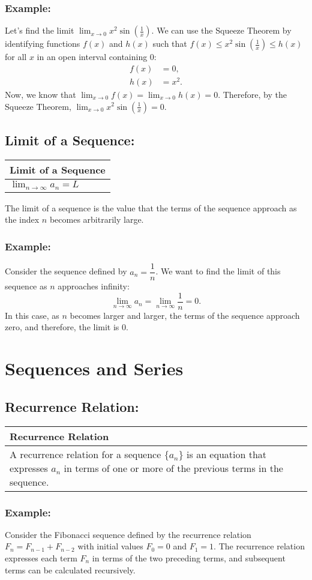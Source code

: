 \documentclass[12pt]{article}
\newcommand{\formula}[2]{
    {\renewcommand{\arraystretch}{2}
        \begin{center}
        \begin{tabular}{|p{0.9\textwidth}|}
        \hline
        \textbf{#1} \\
        \hline
        #2 \\
        \hline
        \end{tabular}
        \end{center}
    }
}
\begin{document}
\subsubsection{Example:}
Let's find the limit $\lim_{x \to 0} x^2 \sin\left(\frac{1}{x}\right)$. We can use the Squeeze Theorem by identifying functions $f(x)$ and $h(x)$ such that $f(x) \leq x^2 \sin\left(\frac{1}{x}\right) \leq h(x)$ for all $x$ in an open interval containing $0$:
\[
\begin{aligned}
    f(x) &= 0, \\
    h(x) &= x^2.
\end{aligned}
\]
Now, we know that $\lim_{x \to 0} f(x) = \lim_{x \to 0} h(x) = 0$. Therefore, by the Squeeze Theorem, $\lim_{x \to 0} x^2 \sin\left(\frac{1}{x}\right) = 0$.

\subsection{Limit of a Sequence: }
\formula{Limit of a Sequence}{
    $\lim_{n \to \infty} a_n = L$
}
The limit of a sequence is the value that the terms of the sequence approach as the index $n$ becomes arbitrarily large.
\subsubsection{Example: }
Consider the sequence defined by $a_n = \dfrac{1}{n}$. We want to find the limit of this sequence as $n$ approaches infinity:
\[
\lim_{n \to \infty} a_n = \lim_{n \to \infty} \frac{1}{n} = 0.
\]
In this case, as $n$ becomes larger and larger, the terms of the sequence approach zero, and therefore, the limit is $0$.

\vspace{\baselineskip}
\vspace{\baselineskip}

\section{Sequences and Series}

\subsection{Recurrence Relation: }
\formula{Recurrence Relation}{
    A recurrence relation for a sequence $\{a_n\}$ is an equation that expresses $a_n$ in terms of one or more of the previous terms in the sequence.
}
\subsubsection{Example: }
Consider the Fibonacci sequence defined by the recurrence relation $F_{n} = F_{n-1} + F_{n-2}$ with initial values $F_{0} = 0$ and $F_{1} = 1$. The recurrence relation expresses each term $F_{n}$ in terms of the two preceding terms, and subsequent terms can be calculated recursively.
\end{document}

